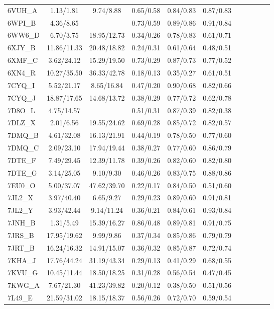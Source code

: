 \begin{tabular}{lcccccccccc}
6VUH\_A & 1.13/1.81 & 9.74/8.88 & 0.65/0.58 & 0.84/0.83 & 0.87/0.83 \\
6WPI\_B & 4.36/8.65 &  & 0.73/0.59 & 0.89/0.86 & 0.91/0.84 \\
6WW6\_D & 6.70/3.75 & 18.95/12.73 & 0.34/0.26 & 0.78/0.83 & 0.61/0.71 \\
6XJY\_B & 11.86/11.33 & 20.48/18.82 & 0.24/0.31 & 0.61/0.64 & 0.48/0.51 \\
6XMF\_C & 3.62/24.12 & 15.29/19.50 & 0.73/0.29 & 0.87/0.73 & 0.77/0.52 \\
6XN4\_R & 10.27/35.50 & 36.33/42.78 & 0.18/0.13 & 0.35/0.27 & 0.61/0.51 \\
7CYQ\_I & 5.52/21.17 & 8.65/16.84 & 0.47/0.20 & 0.90/0.68 & 0.82/0.66 \\
7CYQ\_J & 18.87/17.65 & 14.68/13.72 & 0.38/0.29 & 0.77/0.72 & 0.62/0.78 \\
7D8O\_L & 4.75/14.57 &  & 0.51/0.31 & 0.87/0.39 & 0.82/0.38 \\
7DLZ\_X & 2.01/6.56 & 19.55/24.62 & 0.69/0.28 & 0.85/0.72 & 0.82/0.57 \\
7DMQ\_B & 4.61/32.08 & 16.13/21.91 & 0.44/0.19 & 0.78/0.50 & 0.77/0.60 \\
7DMQ\_C & 2.09/23.10 & 17.94/19.44 & 0.38/0.27 & 0.77/0.60 & 0.86/0.79 \\
7DTE\_F & 7.49/29.45 & 12.39/11.78 & 0.39/0.26 & 0.82/0.60 & 0.82/0.80 \\
7DTE\_G & 3.14/25.05 & 9.10/9.30 & 0.46/0.26 & 0.83/0.75 & 0.88/0.86 \\
7EU0\_O & 5.00/37.07 & 47.62/39.70 & 0.22/0.17 & 0.84/0.50 & 0.51/0.60 \\
7JL2\_X & 3.97/40.40 & 6.65/9.27 & 0.29/0.23 & 0.89/0.60 & 0.91/0.81 \\
7JL2\_Y & 3.93/42.44 & 9.14/11.24 & 0.36/0.21 & 0.84/0.61 & 0.93/0.84 \\
7JNH\_B & 1.31/5.49 & 15.39/16.27 & 0.86/0.48 & 0.89/0.81 & 0.91/0.75 \\
7JRS\_B & 17.95/19.62 & 9.99/9.86 & 0.37/0.34 & 0.85/0.86 & 0.79/0.79 \\
7JRT\_B & 16.24/16.32 & 14.91/15.07 & 0.36/0.32 & 0.85/0.87 & 0.72/0.74 \\
7KHA\_J & 17.76/44.24 & 31.19/43.34 & 0.29/0.13 & 0.41/0.29 & 0.68/0.55 \\
7KVU\_G & 10.45/11.44 & 18.50/18.25 & 0.31/0.28 & 0.56/0.54 & 0.47/0.45 \\
7KWG\_A & 7.67/21.30 & 41.23/39.82 & 0.20/0.12 & 0.38/0.50 & 0.51/0.56 \\
7L49\_E & 21.59/31.02 & 18.15/18.37 & 0.56/0.26 & 0.72/0.70 & 0.59/0.54 \\

\end{tabular}
